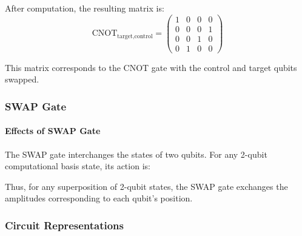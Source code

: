 After computation, the resulting matrix is:
\[
  \text{CNOT}_{\text{target,control}} = \begin{pmatrix}
    1 & 0 & 0 & 0 \\
    0 & 0 & 0 & 1 \\
    0 & 0 & 1 & 0 \\
    0 & 1 & 0 & 0
  \end{pmatrix}
\]

This matrix corresponds to the CNOT gate with the control and target qubits
swapped.

\vspace{0.3cm}

\subsubsection*{SWAP Gate}


\paragraph{Effects of SWAP Gate}\label{par:Effects of SWAP Gate}
The SWAP gate interchanges the states of two qubits. For any 2-qubit
computational basis state, its action is:

\nt{
  \[
    \text{SWAP} \ket{00} = \ket{00}, \quad
    \text{SWAP} \ket{01} = \ket{10}, \quad
    \text{SWAP} \ket{10} = \ket{01}, \quad
    \text{SWAP} \ket{11} = \ket{11}
  \]
}

Thus, for any superposition of 2-qubit states, the SWAP gate exchanges the
amplitudes corresponding to each qubit's position.

\subsubsection*{Circuit Representations}

